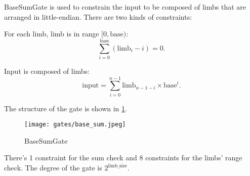 
\hspace*{\fill}

\indent BaseSumGate is used to constrain the input to be composed of limbs that are arranged in little-endian. There are two kinds of constraints:

For each limb, limb is in range $[0, \text{base})$:
\[ \sum_{i=0}^{\text{base}}(\text{limb}_i - i) = 0. \]

Input is composed of limbs:
\[ \text{input} = \sum_{i=0}^{n-1} \text{limb}_{n-1-i} \times \text{base}^i. \]

The structure of the gate is shown in \ref{fig:base-sum}.
\begin{figure}[!ht]
    \centering
    \texttt{[image: gates/base\_sum.jpeg]}
    \caption{BaseSumGate}
    \label{fig:base-sum}
\end{figure}

There's 1 constraint for the sum check and 8 constraints for the limbs' range check. The degree of the gate is $2^{\text{limb\_size}}$.
